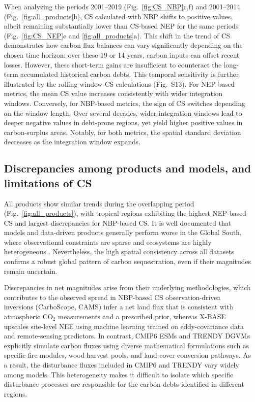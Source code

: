 \documentclass[ProofPDF]{./Styles/Jnls-Template-V3}
\begin{document}
When analyzing the periods 2001--2019 (Fig.~\ref{fig:CS_NBP}c,f) and 2001--2014 (Fig.~\ref{fig:all_products}b), CS calculated with NBP shifts to positive values, albeit remaining substantially lower than CS-based NEP for the same periods (Fig.~\ref{fig:CS_NEP}c and \ref{fig:all_products}a). This shift in the trend of CS demonstrates how carbon flux balances can vary significantly depending on the chosen time horizon: over these 19 or 14 years, carbon inputs can offset recent losses. However, these short-term gains are insufficient to counteract the long-term accumulated historical carbon debts. This temporal sensitivity is further illustrated by the rolling-window CS calculations (Fig.~S13). For NEP-based metrics, the mean CS value increases consistently with wider integration windows. Conversely, for NBP-based metrics, the sign of CS switches depending on the window length. Over several decades, wider integration windows lead to deeper negative values in debt-prone regions, yet yield higher positive values in carbon-surplus areas. Notably, for both metrics, the spatial standard deviation decreases as the integration window expands.

\subsection{Discrepancies among products and models, and limitations of CS}
All products show similar trends during the overlapping period (Fig.~\ref{fig:all_products}), with tropical regions exhibiting the highest NEP-based CS and largest discrepancies for NBP-based CS.  It is well documented that models and data-driven products generally perform worse in the Global South, where observational constraints are sparse and ecosystems are highly heterogeneous \citep{Gier2024}. Nevertheless, the high spatial consistency across all datasets confirms a robust global pattern of carbon sequestration, even if their magnitudes remain uncertain.

Discrepancies in net magnitudes arise from their underlying methodologies, which contributes to the observed spread in NBP-based CS observation-driven inversions (CarboScope, CAMS) infer a net land flux that is consistent with atmospheric CO$_2$ measurements and a prescribed prior, whereas X-BASE upscales site-level NEE using machine learning trained on eddy-covariance data and remote-sensing predictors. In contrast, CMIP6 ESMs and TRENDY DGVMs explicitly simulate carbon fluxes using diverse mathematical formulations such as specific fire modules, wood harvest pools, and land-cover conversion pathways. As a result, the disturbance fluxes included in CMIP6 and TRENDY vary widely among models. This heterogeneity makes it difficult to isolate which specific disturbance processes are responsible for the carbon debts identified in different regions.
\end{document}
